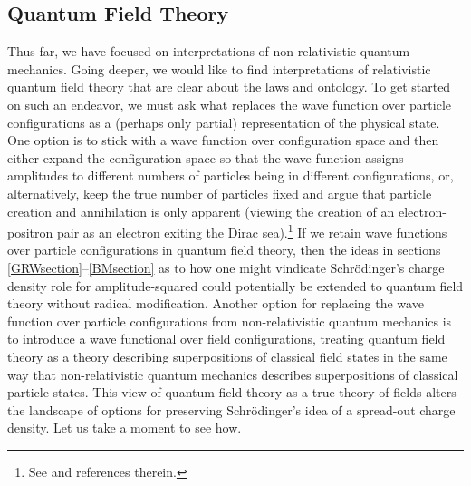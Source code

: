 \documentclass[onecolumn,secnumarabic,amsmath,amssymb,balancelastpage,nofootinbib]{article}
\begin{document}
\subsection{Quantum Field Theory}\label{QFT}

Thus far, we have focused on interpretations of non-relativistic quantum mechanics.  Going deeper, we would like to find interpretations of relativistic quantum field theory that are clear about the laws and ontology.  To get started on such an endeavor, we must ask what replaces the wave function over particle configurations as a (perhaps only partial) representation of the physical state.  One option is to stick with a wave function over configuration space and then either expand the configuration space so that the wave function assigns amplitudes to different numbers of particles being in different configurations, or, alternatively, keep the true number of particles fixed and argue that particle creation and annihilation is only apparent (viewing the creation of an electron-positron pair as an electron exiting the Dirac sea).\footnote{See \cite{struyve2011, tumulka2018, durr2020} and references therein.}  If we retain wave functions over particle configurations in quantum field theory, then the ideas in sections \ref{GRWsection}--\ref{BMsection} as to how one might vindicate Schr\"{o}dinger's charge density role for amplitude-squared could potentially be extended to quantum field theory without radical modification.  Another option for replacing the wave function over particle configurations from non-relativistic quantum mechanics is to introduce a wave functional over field configurations, treating quantum field theory as a theory describing superpositions of classical field states in the same way that non-relativistic quantum mechanics describes superpositions of classical particle states.  This view of quantum field theory as a true theory of fields alters the landscape of options for preserving Schr\"{o}dinger's idea of a spread-out charge density.  Let us take a moment to see how.
\end{document}
